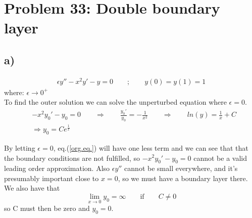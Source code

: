 \documentclass[a4paper,10pt]{article}
\begin{document}
 
 
\lstset{style=mystyle}



\section*{Problem 33: Double boundary layer}
\subsection*{a)}
\begin{align}
\epsilon y'' - x^2 y' - y = 0 \qquad ; \qquad y(0) = y(1) = 1 \label{org.eq.}
\end{align}
where: $\epsilon \rightarrow 0^+$\\
To find the outer solution we can solve the unperturbed equation where $\epsilon = 0$.
\begin{align}
&-x^2 y_0' - y_0 = 0 \qquad \Rightarrow \qquad \frac{y_0'}{y_0}= -\frac{1}{x^2}
\qquad \Rightarrow \qquad ln(y) = \frac{1}{x} + C \nonumber \\
&\Rightarrow y_0 = Ce^{\frac{1}{x}} \label{out.sol.}
\end{align}

By letting $\epsilon=0$, eq.(\ref{org.eq.}) will have one less term and we can see that that the boundary conditions are not fulfilled, so $-x^2y_0' - y_0 = 0$ cannot be a valid leading order approximation. Also $\epsilon y''$ cannot be small everywhere, and it's presumably important close to $x=0$, so we must have a boundary layer there. We also have that \[ \lim_{x \to 0} y_0 = \infty \qquad \text{if} \qquad C \neq 0 \] so C must then be zero and $y_0 = 0$.\\
\end{document}

